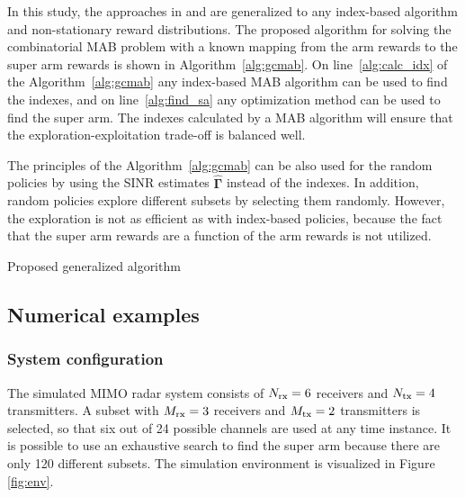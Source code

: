 \documentclass[english, 12pt, a4paper, elec, utf8, a-1b, online]{aaltothesis}
\newcommand{\vsinrb}{\widehat{\boldsymbol{\Gamma}}}
\begin{document}
In this study, the approaches in \cite{Mukherjee2012} and \cite{Kuai2019} are generalized to any index-based algorithm and non-stationary reward distributions. 
The proposed algorithm for solving the combinatorial MAB problem with a known mapping from the arm rewards to the super arm rewards is shown in Algorithm~\ref{alg:gcmab}.
On line~\ref{alg:calc_idx} of the Algorithm~\ref{alg:gcmab} any index-based MAB algorithm can be used to find the indexes, and on line~\ref{alg:find_sa} any optimization method can be used to find the super arm.
The indexes calculated by a MAB algorithm will ensure that the exploration-exploitation trade-off is balanced well.

The principles of the Algorithm~\ref{alg:gcmab} can be also used for the random policies by using the SINR estimates $\vsinrb$ instead of the indexes.
In addition, random policies explore different subsets by selecting them randomly.
However, the exploration is not as efficient as with index-based policies, because the fact that the super arm rewards are a function of the arm rewards is not utilized.

\begin{algorithm}[h]
\SetAlgoLined
{}
\caption{Proposed generalized algorithm}
\label{alg:gcmab}
\end{algorithm}

\subsection{Numerical examples}
\label{sec:sim}


\subsubsection{System configuration}
\label{sec:sys_conf}
The simulated MIMO radar system consists of ${N_{\text{rx}}}=6$ receivers and ${N_{\text{tx}}}=4$ transmitters.
A subset with ${M_{\text{rx}}}=3$ receivers and ${M_{\text{tx}}}=2$ transmitters is selected, so that six out of 24 possible channels are used at any time instance.
It is possible to use an exhaustive search to find the super arm because there are only 120 different subsets.
The simulation environment is visualized in Figure \ref{fig:env}.
\end{document}
